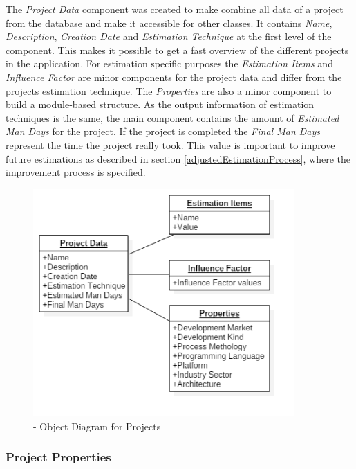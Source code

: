 The \textit{Project Data} component was created to make combine all data of a project from the database and make it accessible for other classes. It contains \textit{Name}, \textit{Description}, \textit{Creation Date} and \textit{Estimation Technique} at the first level of the component. This makes it possible to get a fast overview of the different projects in the application. For estimation specific purposes the \textit{Estimation Items} and \textit{Influence Factor} are minor components for the project data and differ from the projects estimation technique. The \textit{Properties} are also a minor component to build a module-based structure. As the output information of estimation techniques is the same, the main component contains the amount of \textit{Estimated Man Days} for the project. If the project is completed the \textit{Final Man Days} represent the time the project really took. This value is important to improve future estimations as described in section \ref{adjustedEstimationProcess}, where the improvement process is specified.
\begin{figure}[h] 
	\centering 
	\includegraphics[width=10cm]{images/ObjectDiagramProject.png} 
	\caption{- Object Diagram for Projects} 
	\label{fig:objectDiagrammProject}
\end{figure}

\subsubsection{Project Properties}

